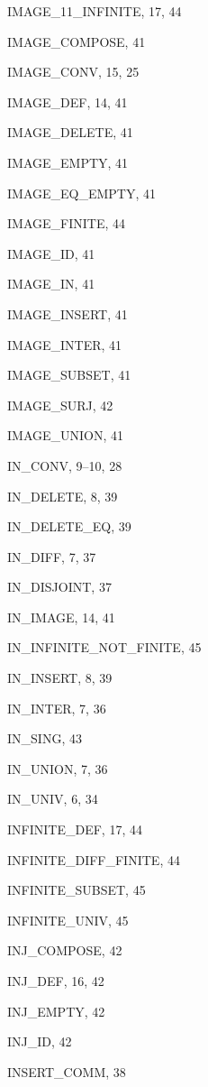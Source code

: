 \begin{theindex}
  \item {\ptt IMAGE\_11\_INFINITE}, 17, 44
  \item {\ptt IMAGE\_COMPOSE}, 41
  \item {\ptt IMAGE\_CONV}, 15, 25
  \item {\ptt IMAGE\_DEF}, 14, 41
  \item {\ptt IMAGE\_DELETE}, 41
  \item {\ptt IMAGE\_EMPTY}, 41
  \item {\ptt IMAGE\_EQ\_EMPTY}, 41
  \item {\ptt IMAGE\_FINITE}, 44
  \item {\ptt IMAGE\_ID}, 41
  \item {\ptt IMAGE\_IN}, 41
  \item {\ptt IMAGE\_INSERT}, 41
  \item {\ptt IMAGE\_INTER}, 41
  \item {\ptt IMAGE\_SUBSET}, 41
  \item {\ptt IMAGE\_SURJ}, 42
  \item {\ptt IMAGE\_UNION}, 41
  \item {\ptt IN\_CONV}, 9--10, 28
  \item {\ptt IN\_DELETE}, 8, 39
  \item {\ptt IN\_DELETE\_EQ}, 39
  \item {\ptt IN\_DIFF}, 7, 37
  \item {\ptt IN\_DISJOINT}, 37
  \item {\ptt IN\_IMAGE}, 14, 41
  \item {\ptt IN\_INFINITE\_NOT\_FINITE}, 45
  \item {\ptt IN\_INSERT}, 8, 39
  \item {\ptt IN\_INTER}, 7, 36
  \item {\ptt IN\_SING}, 43
  \item {\ptt IN\_UNION}, 7, 36
  \item {\ptt IN\_UNIV}, 6, 34
  \item {\ptt INFINITE\_DEF}, 17, 44
  \item {\ptt INFINITE\_DIFF\_FINITE}, 44
  \item {\ptt INFINITE\_SUBSET}, 45
  \item {\ptt INFINITE\_UNIV}, 45
  \item {\ptt INJ\_COMPOSE}, 42
  \item {\ptt INJ\_DEF}, 16, 42
  \item {\ptt INJ\_EMPTY}, 42
  \item {\ptt INJ\_ID}, 42
  \item {\ptt INSERT\_COMM}, 38

\end{theindex}

